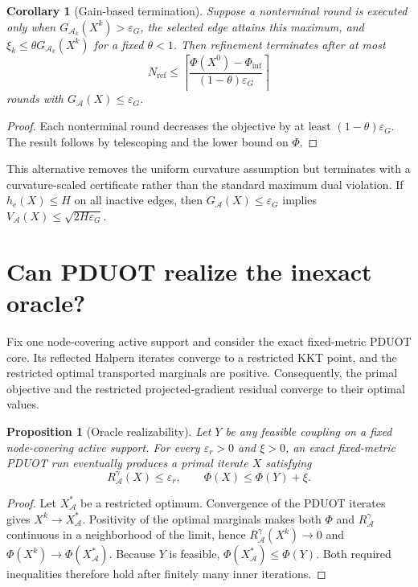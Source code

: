 \documentclass[11pt]{article}
\newtheorem{proposition}{Proposition}
\newtheorem{corollary}{Corollary}
\begin{document}
\begin{corollary}[Gain-based termination]\label{cor:gain-termination}
Suppose a nonterminal round is executed only when $G_{\mathcal A_k}(X^k)>\varepsilon_G$, the selected edge attains this maximum, and $\xi_k\leq\theta G_{\mathcal A_k}(X^k)$ for a fixed $\theta<1$.
Then refinement terminates after at most
$$N_{\mathrm{ref}}\leq\left\lceil\frac{\Phi(X^0)-\Phi_{\inf}}{(1-\theta)\varepsilon_G}\right\rceil$$
rounds with $G_{\mathcal A}(X)\leq\varepsilon_G$.
\end{corollary}

\begin{proof}
Each nonterminal round decreases the objective by at least $(1-\theta)\varepsilon_G$.
The result follows by telescoping and the lower bound on $\Phi$.
\end{proof}

This alternative removes the uniform curvature assumption but terminates with a curvature-scaled certificate rather than the standard maximum dual violation.
If $h_e(X)\leq H$ on all inactive edges, then $G_{\mathcal A}(X)\leq\varepsilon_G$ implies $V_{\mathcal A}(X)\leq\sqrt{2H\varepsilon_G}$.

\section{Can PDUOT realize the inexact oracle?}

Fix one node-covering active support and consider the exact fixed-metric PDUOT core.
Its reflected Halpern iterates converge to a restricted KKT point, and the restricted optimal transported marginals are positive.
Consequently, the primal objective and the restricted projected-gradient residual converge to their optimal values.

\begin{proposition}[Oracle realizability]\label{prop:oracle-realizability}
Let $Y$ be any feasible coupling on a fixed node-covering active support.
For every $\varepsilon_r>0$ and $\xi>0$, an exact fixed-metric PDUOT run eventually produces a primal iterate $X$ satisfying
$$R_{\mathcal A}^{\gamma}(X)\leq\varepsilon_r,\qquad \Phi(X)\leq\Phi(Y)+\xi.$$
\end{proposition}

\begin{proof}
Let $X_{\mathcal A}^*$ be a restricted optimum.
Convergence of the PDUOT iterates gives $X^k\to X_{\mathcal A}^*$.
Positivity of the optimal marginals makes both $\Phi$ and $R_{\mathcal A}^{\gamma}$ continuous in a neighborhood of the limit, hence $R_{\mathcal A}^{\gamma}(X^k)\to0$ and $\Phi(X^k)\to\Phi(X_{\mathcal A}^*)$.
Because $Y$ is feasible, $\Phi(X_{\mathcal A}^*)\leq\Phi(Y)$.
Both required inequalities therefore hold after finitely many inner iterations.
\end{proof}
\end{document}
